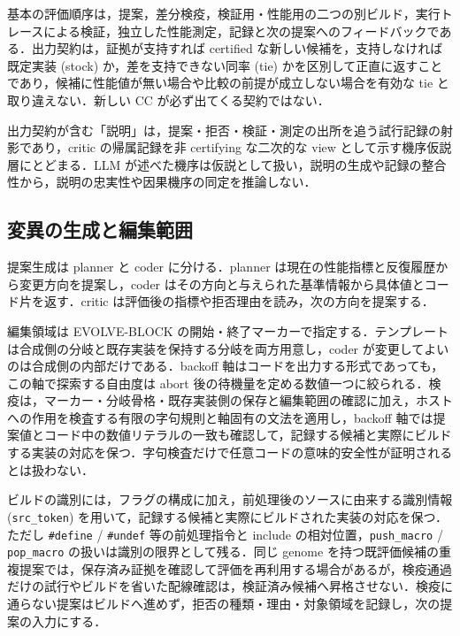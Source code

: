 \documentclass[submit,techrep,noauthor]{ipsj}
\begin{document}
基本の評価順序は，提案，差分検疫，検証用・性能用の二つの別ビルド，実行トレースによる検証，独立した性能測定，記録と次の提案へのフィードバックである．出力契約は，証拠が支持すれば certified な新しい候補を，支持しなければ既定実装 (stock) か，差を支持できない同率 (tie) かを区別して正直に返すことであり，候補に性能値が無い場合や比較の前提が成立しない場合を有効な tie と取り違えない．新しい CC が必ず出てくる契約ではない．

出力契約が含む「説明」は，提案・拒否・検証・測定の出所を追う試行記録の射影であり，critic の帰属記録を非 certifying な二次的な view として示す機序仮説層にとどまる．LLM が述べた機序は仮説として扱い，説明の生成や記録の整合性から，説明の忠実性や因果機序の同定を推論しない．

\subsection{変異の生成と編集範囲}
\label{sec:design-gen}

提案生成は planner と coder に分ける．planner は現在の性能指標と反復履歴から変更方向を提案し，coder はその方向と与えられた基準情報から具体値とコード片を返す．critic は評価後の指標や拒否理由を読み，次の方向を提案する．

編集領域は EVOLVE-BLOCK の開始・終了マーカーで指定する．テンプレートは合成側の分岐と既存実装を保持する分岐を両方用意し，coder が変更してよいのは合成側の内部だけである．backoff 軸はコードを出力する形式であっても，この軸で探索する自由度は abort 後の待機量を定める数値一つに絞られる．検疫は，マーカー・分岐骨格・既存実装側の保存と編集範囲の確認に加え，ホストへの作用を検査する有限の字句規則と軸固有の文法を適用し，backoff 軸では提案値とコード中の数値リテラルの一致も確認して，記録する候補と実際にビルドする実装の対応を保つ．字句検査だけで任意コードの意味的安全性が証明されるとは扱わない．

ビルドの識別には，フラグの構成に加え，前処理後のソースに由来する識別情報 (\texttt{src\_token}) を用いて，記録する候補と実際にビルドされた実装の対応を保つ．ただし \texttt{\#define} / \texttt{\#undef} 等の前処理指令と include の相対位置，\texttt{push\_macro} / \texttt{pop\_macro} の扱いは識別の限界として残る．同じ genome を持つ既評価候補の重複提案では，保存済み証拠を確認して評価を再利用する場合があるが，検疫通過だけの試行やビルドを省いた配線確認は，検証済み候補へ昇格させない．検疫に通らない提案はビルドへ進めず，拒否の種類・理由・対象領域を記録し，次の提案の入力にする．
\end{document}
